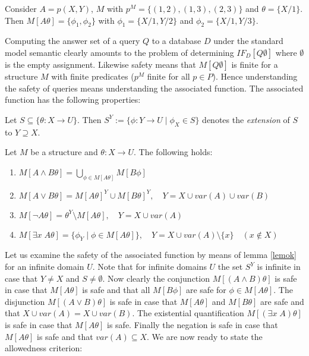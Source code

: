 \begin{Bsp} Consider $A=p(X,Y)$, $M$ with $p^M = \{(1,2),(1,3),(2,3)\}$ and $\theta=\{X/1\}$.
Then $M[A\theta] = \{\phi_1,\phi_2\}$ with $\phi_1=\{X/1,Y/2\}$ and $\phi_2=\{X/1,Y/3\}$.
\end{Bsp}  

Computing the answer set of a query $Q$ to a database $D$ under the standard model semantic
clearly amounts to the problem of determining $IF_D[Q\emptyset]$ where $\emptyset$ is the
empty assignment. Likewise safety means that $M[Q\emptyset]$ is finite for a structure $M$
with finite predicates ($p^M$ finite for all $p \in P$). Hence understanding the safety of 
queries means understanding the associated function. The associated function has the following 
properties:

\begin{Def} Let $S \subseteq \{ \theta : X \rightarrow U \}$. Then 
$S^Y := \{\phi:Y \rightarrow U\;|\; \phi_X \in S \}$ denotes the {\em extension}
of $S$ to $Y \supseteq X$.
\end{Def}

\begin{Lem} 
\label{lemok}
Let $M$ be a structure and $\theta:X \rightarrow U$. The following
holds:
\begin{enumerate}
\item $M[A\wedge B\theta] = \bigcup_{\phi \in M[A\theta]} M[B\phi]$
\item $M[A\vee B\theta] = M[A\theta]^Y \cup M[B\theta]^Y, \quad Y = X \cup var(A) \cup var(B)$
\item $M[\neg A \theta] = {\theta}^Y \setminus M[A\theta], \quad Y = X \cup var(A)$
\item $M[\exists x\; A\theta] = \{ \phi_Y \; | \; \phi \in M[A\theta]\}, \quad Y = X \cup var(A)
\setminus \{x\} \quad (x \notin X)$
\end{enumerate}
\end{Lem}

Let us examine the safety of the associated function by means of lemma \ref{lemok} for
an infinite domain $U$. Note that for infinite domains $U$ the set $S^Y$ is infinite in
case that $Y\not=X$ and $S\not=\emptyset$. Now clearly the conjunction $M[(A \wedge B)\theta]$
is safe in case that $M[A\theta]$ is safe and that all $M[B\phi]$ are safe for $\phi 
\in M[A\theta]$. The disjunction $M[(A\vee B)\theta]$ is safe in case that $M[A\theta]$ and
$M[B\theta]$ are safe and that $X \cup var(A)=X \cup var(B)$. The existential quantification
$M[(\exists x\;A)\theta]$ is safe in case that $M[A\theta]$ is safe. Finally the negation is
safe in case that $M[A\theta]$ is safe and that $var(A) \subseteq X$. We are now ready
to state the allowedness criterion:

